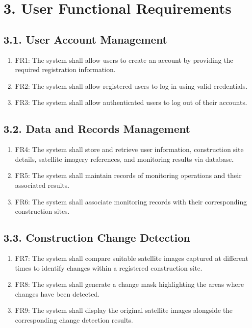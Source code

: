 \documentclass[12pt,a4paper]{report}
\begin{document}
\section{3. User Functional
Requirements}\label{user-functional-requirements-1}

\subsection{3.1. User Account
Management}\label{user-account-management}

\begin{enumerate}
\def\labelenumi{\arabic{enumi}.}
\item
  FR1: The system shall allow users to create an account by providing
  the required registration information.
\item
  FR2: The system shall allow registered users to log in using valid
  credentials.
\item
  FR3: The system shall allow authenticated users to log out of their
  accounts.
\end{enumerate}

\subsection{3.2. Data and Records
Management}\label{data-and-records-management}

\begin{enumerate}
\def\labelenumi{\arabic{enumi}.}
\item
  FR4: The system shall store and retrieve user information,
  construction site details, satellite imagery references, and
  monitoring results via database.
\item
  FR5: The system shall maintain records of monitoring operations and
  their associated results.
\item
  FR6: The system shall associate monitoring records with their
  corresponding construction sites.
\end{enumerate}

\subsection{3.3. Construction Change
Detection}\label{construction-change-detection}

\begin{enumerate}
\def\labelenumi{\arabic{enumi}.}
\item
  FR7: The system shall compare suitable satellite images captured at
  different times to identify changes within a registered construction
  site.
\item
  FR8: The system shall generate a change mask highlighting the areas
  where changes have been detected.
\item
  FR9: The system shall display the original satellite images alongside
  the corresponding change detection results.
\end{enumerate}
\end{document}
